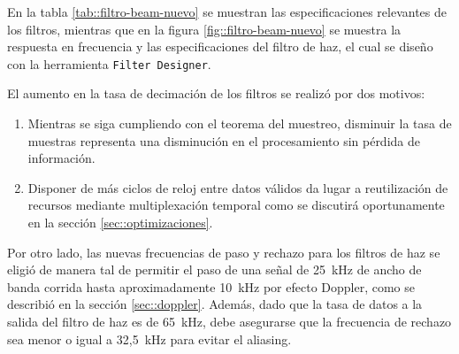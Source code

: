 \documentclass[../../main.tex]{subfiles}
\begin{document}
En la tabla \ref{tab::filtro-beam-nuevo} se muestran las especificaciones relevantes de los filtros, mientras que en la figura \ref{fig::filtro-beam-nuevo} se muestra la respuesta en frecuencia y las especificaciones del filtro de haz, el cual se diseño con la herramienta \texttt{Filter Designer}\cite{filter-designer}.

El aumento en la tasa de decimación de los filtros se realizó por dos motivos:
\begin{enumerate}
    \item Mientras se siga cumpliendo con el teorema del muestreo, disminuir la tasa de muestras representa una disminución en el procesamiento sin pérdida de información.
    \item Disponer de más ciclos de reloj entre datos válidos da lugar a reutilización de recursos mediante multiplexación temporal como se discutirá oportunamente en la sección \ref{sec::optimizaciones}.
\end{enumerate}

Por otro lado, las nuevas frecuencias de paso y rechazo para los filtros de haz se eligió de manera tal de permitir el paso de una señal de 25~kHz de ancho de banda corrida hasta aproximadamente 10~kHz por efecto Doppler, como se describió en la sección \ref{sec::doppler}. Además, dado que la tasa de datos a la salida del filtro de haz es de 65~kHz, debe asegurarse que la frecuencia de rechazo sea menor o igual a 32,5~kHz para evitar el aliasing.

\begin{table}[H]
    \centering
    \caption{Configuraciones principales de los nuevos filtros de banda y de haz.}
    \label{tab::filtro-beam-nuevo}
\end{table}
\end{document}
